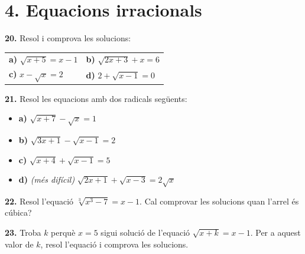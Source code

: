 \documentclass[13pt,a4paper]{extarticle}
\begin{document}
\section*{4. Equacions irracionals}

\par\noindent\begin{minipage}{\linewidth}
\textbf{20.} Resol i comprova les solucions:\par


\begin{tabular}{@{}p{.46\linewidth}p{.46\linewidth}@{}}
\textbf{a)} $\sqrt{x+5}=x-1$ & \textbf{b)} $\sqrt{2x+3}+x=6$ \\[3pt]
\textbf{c)} $x-\sqrt{x}=2$ & \textbf{d)} $2+\sqrt{x-1}=0$ \\[3pt]
\end{tabular}\par
\end{minipage}\par\vspace{1.6mm}
\par\noindent\begin{minipage}{\linewidth}
\textbf{21.} Resol les equacions amb dos radicals següents:\par

\begin{itemize}[leftmargin=0pt,itemsep=6pt,topsep=4pt,parsep=0pt,label={}]
\item \textbf{a)} $\sqrt{x+7}-\sqrt{x}=1$
\item \textbf{b)} $\sqrt{3x+1}-\sqrt{x-1}=2$
\item \textbf{c)} $\sqrt{x+4}+\sqrt{x-1}=5$
\item \textbf{d)} \emph{(més difícil)} $\sqrt{2x+1}+\sqrt{x-3}=2\sqrt{x}$
\end{itemize}
\end{minipage}\par\vspace{1.6mm}
\par\noindent\begin{minipage}{\linewidth}
\textbf{22.} Resol l'equació $\sqrt[3]{x^3-7}=x-1$. Cal comprovar les solucions quan l'arrel és cúbica?\par
\end{minipage}\par\vspace{1.6mm}
\par\noindent\begin{minipage}{\linewidth}
\textbf{23.} Troba $k$ perquè $x=5$ sigui solució de l'equació $\sqrt{x+k}=x-1$. Per a aquest valor de $k$, resol l'equació i comprova les solucions.\par
\end{minipage}\par\vspace{1.6mm}
\end{document}
